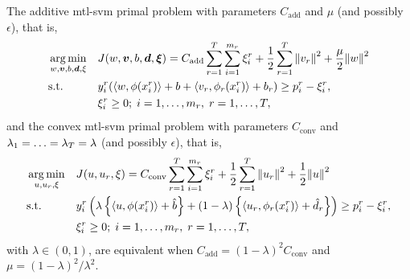 \begin{prop}\label{prop:add_conv_equiv}
    The {additive} \acrshort{mtl}-\acrshort{svm} primal problem with parameters $C_\text{add}$ and $\mu$ (and possibly $\epsilon$), that is,
    \begin{equation}\label{eq:svmmtl_primal_add_equiv}
        \begin{aligned}
        & \argmin_{w, \fv{v}, b, \fv{d}, \xi}
        & & {J({w}, \fv{v}, b, \fv{d}, \fv{\xi}) = C_\text{add} \sum_{r= 1}^T \sum_{i=1}^{m_r} {\xi_{i}^r} + \frac{1}{2} \sum_{r= 1}^T{\norm{{v}_r}^2} + \frac{\mu}{2} {\norm{{w}}}^2} \\
        & \text{s.t.}
        & & y_{i}^r (\dotp{w}{\phi(x_{i}^r)} + b  + \dotp{{v}_r}{\phi_r(x_{i}^r)} + b_r) \geq p_{i}^r - \xi_{i}^r ,  \\
        & & & \xi_{i}^r \geq 0; \;  i=1 , \dotsc , m_r, \;  r= 1,\dotsc, T  , \\
        \end{aligned}
    \end{equation}
    and the {convex} \acrshort{mtl}-\acrshort{svm} primal problem with parameters $C_\text{conv}$ and $\lambda_1=\ldots=\lambda_T = \lambda$ (and possibly $\epsilon$), that is,
    \begin{equation}\label{eq:svmmtl_primal_convex_equiv}
        \begin{aligned}
        & \argmin_{u, {u}_r, \xi}
        & & {J({u}, {u}_r, \xi) = C_\text{conv} \sum_{r= 1}^T \sum_{i=1}^{m_r} {\xi_{i}^r} + \frac{1}{2} \sum_{r= 1}^T{\norm{{u}_r}^2} + \frac{1}{2} {\norm{{u}}}^2} \\
        & \text{s.t.}
        & & y_{i}^r \left(\lambda \left\lbrace \dotp{u}{\phi(x_{i}^r)} + \hat{b} \right\rbrace + (1 - \lambda) \left\lbrace \dotp{{u}_r}{\phi_r(x_{i}^r)} + \hat{d}_r \right\rbrace  \right) \geq p_{i}^r - \xi_{i}^r ,  \\
        & & & \xi_{i}^r \geq 0; \;  i=1 , \dotsc , m_r, \;  r= 1,\dotsc, T  , \\
        \end{aligned}
    \end{equation}
    with $\lambda \in (0, 1)$, are equivalent when $C_\text{add} = (1 - \lambda)^2 C_\text{conv}$ and $\mu = (1 - \lambda)^2 / \lambda^2$.
    \label{thm_equiv}
\end{prop}
